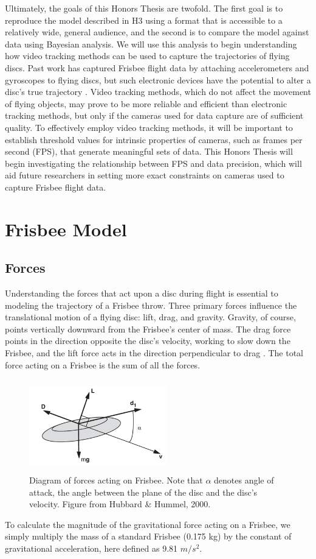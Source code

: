 \documentclass[a4paper,12pt, oneside]{article}
\begin{document}
Ultimately, the goals of this Honors Thesis are twofold. The first goal is to reproduce the model described in H3 using a format that is accessible to a relatively wide, general audience, and the second is to compare the model against data using Bayesian analysis. We will use this analysis to begin understanding how video tracking methods can be used to capture the trajectories of flying discs. Past work has captured Frisbee flight data by attaching accelerometers and gyroscopes to flying discs, but such electronic devices have the potential to alter a disc's true trajectory \cite{lorenz2004}. Video tracking methods, which do not affect the movement of flying objects, may prove to be more reliable and efficient than electronic tracking methods, but only if the cameras used for data capture are of sufficient quality. To effectively employ video tracking methods, it will be important to establish threshold values for intrinsic properties of cameras, such as frames per second (FPS), that generate meaningful sets of data. This Honors Thesis will begin investigating the relationship between FPS and data precision, which will aid future researchers in setting more exact constraints on cameras used to capture Frisbee flight data. 

\section{Frisbee Model}

\subsection{Forces}
Understanding the forces that act upon a disc during flight is essential to modeling the trajectory of a Frisbee throw. Three primary forces influence the translational motion of a flying disc: lift, drag, and gravity. Gravity, of course, points vertically downward from the Frisbee's center of mass.  The drag force points in the direction opposite the disc's velocity, working to slow down the Frisbee, and the lift force acts in the direction perpendicular to drag \cite{H3}. The total force acting on a Frisbee is the sum of all the forces.
\begin{figure}[h]
        \includegraphics[width=6cm, height=4cm]{frisforces}
	\centering
	\caption{Diagram of forces acting on Frisbee. Note that $\alpha$ denotes angle of attack, the angle between the plane of the disc and the disc's velocity. Figure from Hubbard \& Hummel, 2000. \cite{hubbardandhummel}}
	\label{fig:discforces1}
\end{figure}
To calculate the magnitude of the gravitational force acting on a Frisbee, we simply multiply the mass of a standard Frisbee (0.175 kg) by the constant of gravitational acceleration, here defined as  9.81 $m/s^{2}.$ 
 
\end{document}
